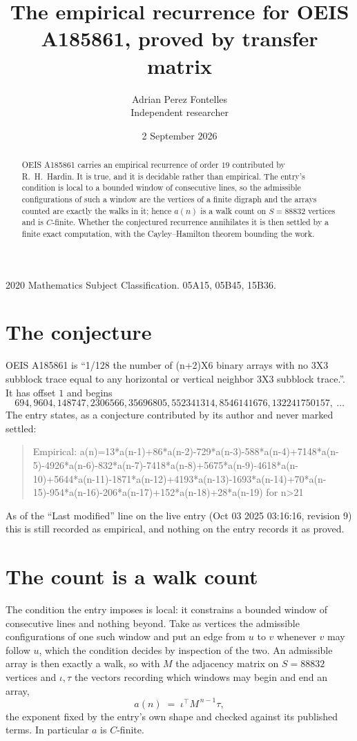 \documentclass[11pt,a4paper]{article}
\title{The empirical recurrence for OEIS A185861, proved by transfer matrix}
\author{Adrian Perez Fontelles\\ \small Independent researcher}
\date{2 September 2026}
\theoremstyle{plain}
\theoremstyle{definition}
\begin{document}
\maketitle

\begin{abstract}
OEIS A185861 carries an empirical recurrence of order $19$ contributed by R.~H.~Hardin. It is
true, and it is decidable rather than empirical. The entry's condition is local to a bounded window of consecutive lines, so
the admissible configurations of such a window are the vertices of a finite digraph and the
arrays counted are exactly the walks in it; hence $a(n)$ is a walk count on $S=88832$ vertices
and is $C$-finite. Whether the conjectured recurrence annihilates it is then settled by a
finite exact computation, with the Cayley--Hamilton theorem bounding the work.
\end{abstract}

\noindent\small 2020 Mathematics Subject Classification. 05A15, 05B45, 15B36.\normalsize

\section{The conjecture}

OEIS A185861 is ``1/128 the number of (n+2)X6 binary arrays with no 3X3 subblock trace equal to any horizontal or vertical neighbor 3X3 subblock trace.''. It has offset $1$ and begins
\[
694, 9604, 148747, 2306566, 35696805, 552341314, 8546141676, 132241750157,\ \dots
\]
The entry states, as a conjecture contributed by its author and never marked settled:
\begin{quote}
Empirical: a(n)=13*a(n-1)+86*a(n-2)-729*a(n-3)-588*a(n-4)+7148*a(n-5)-4926*a(n-6)-832*a(n-7)-7418*a(n-8)+5675*a(n-9)-4618*a(n-10)+5644*a(n-11)-1871*a(n-12)+4193*a(n-13)-1693*a(n-14)+70*a(n-15)-954*a(n-16)-206*a(n-17)+152*a(n-18)+28*a(n-19) for n>21
\end{quote}
As of the ``Last modified'' line on the live entry (Oct 03 2025 03:16:16, revision 9) this is still
recorded as empirical, and nothing on the entry records it as proved.

\section{The count is a walk count}

The condition the entry imposes is local: it constrains a bounded window of consecutive lines and nothing beyond. Take as
vertices the admissible configurations of one such window and put an edge from $u$ to $v$
whenever $v$ may follow $u$, which the condition decides by inspection of the two. An
admissible array is then exactly a walk, so with $M$ the adjacency matrix on $S=88832$ vertices
and $\iota,\tau$ the vectors recording which windows may begin and end an array,
\[
a(n)\;=\;\iota^{\!\top}M^{\,n-1}\tau ,
\]
the exponent fixed by the entry's own shape and checked against its published terms. In
particular $a$ is $C$-finite.
\end{document}
